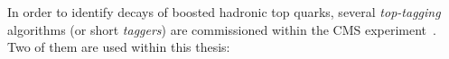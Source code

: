 In order to identify decays of boosted hadronic top quarks, several \textit{top-tagging} algorithms (or short \textit{taggers}) are commissioned within the CMS experiment~\cite{CMS-PAS-JME-13-007, CMS-DP-2014-036}. Two of them are used within this thesis:
